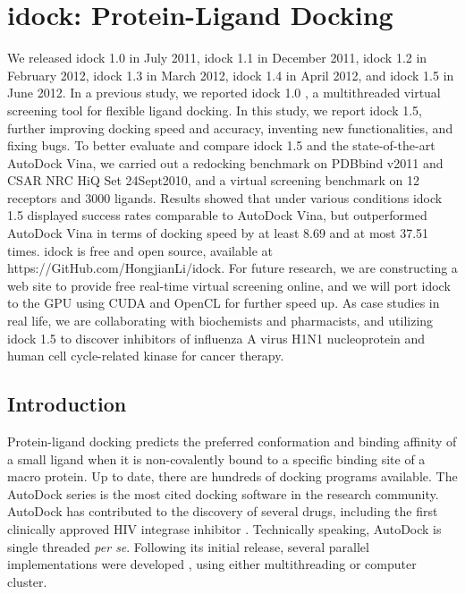 \chapter{idock: Protein-Ligand Docking}

We released idock 1.0 in July 2011, idock 1.1 in December 2011, idock 1.2 in February 2012, idock 1.3 in March 2012, idock 1.4 in April 2012, and idock 1.5 in June 2012. In a previous study, we reported idock 1.0 \citep{1153}, a multithreaded virtual screening tool for flexible ligand docking. In this study, we report idock 1.5, further improving docking speed and accuracy, inventing new functionalities, and fixing bugs. To better evaluate and compare idock 1.5 and the state-of-the-art AutoDock Vina, we carried out a redocking benchmark on PDBbind v2011 and CSAR NRC HiQ Set 24Sept2010, and a virtual screening benchmark on 12 receptors and 3000 ligands. Results showed that under various conditions idock 1.5 displayed success rates comparable to AutoDock Vina, but outperformed AutoDock Vina in terms of docking speed by at least 8.69 and at most 37.51 times. idock is free and open source, available at https://GitHub.com/HongjianLi/idock. For future research, we are constructing a web site to provide free real-time virtual screening online, and we will port idock to the GPU using CUDA and OpenCL for further speed up. As case studies in real life, we are collaborating with biochemists and pharmacists, and utilizing idock 1.5 to discover inhibitors of influenza A virus H1N1 nucleoprotein and human cell cycle-related kinase for cancer therapy.

\section{Introduction}

Protein-ligand docking predicts the preferred conformation and binding affinity of a small ligand when it is non-covalently bound to a specific binding site of a macro protein. Up to date, there are hundreds of docking programs available. The AutoDock series is the most cited docking software in the research community. AutoDock has contributed to the discovery of several drugs, including the first clinically approved HIV integrase inhibitor \citep{1169}. Technically speaking, AutoDock is single threaded \textit{per se}. Following its initial release, several parallel implementations were developed \citep{115,560,782}, using either multithreading or computer cluster.

